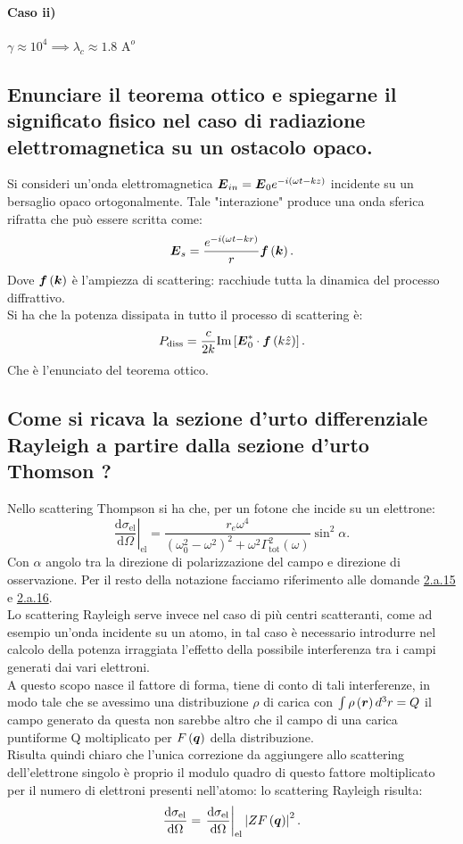 \paragraph{Caso ii)}	$\gamma\approx 10^4 \implies \lambda_{c}\approx 1.8 \text{ A}^o $


\subsection[]{Enunciare il teorema ottico e spiegarne il significato fisico nel caso di radiazione elettromagnetica su un ostacolo opaco.}
\label{sec:3.b.25}
Si consideri un'onda elettromagnetica $\boldsymbol{E}_{in}= \boldsymbol{E}_{0}e^{-i\left( \omega t - kz \right) }$ incidente su un bersaglio opaco ortogonalmente. Tale "interazione" produce una onda sferica rifratta che può essere scritta come:
\[
	\boldsymbol{E}_s= \frac{e^{-i\left( \omega t - kr \right) }}{r}\boldsymbol{f}\left( \boldsymbol{k} \right) 
.\] 
Dove $\boldsymbol{f}\left( \boldsymbol{k} \right) $ è l'ampiezza di scattering: racchiude tutta la dinamica del processo diffrattivo.\\
Si ha che la potenza dissipata in tutto il processo di scattering è:
\[
	P_{\text{diss}}= \frac{c}{2k} \text{Im}\left[ \boldsymbol{E}^*_{0}\cdot \boldsymbol{f}\left( k \hat{z} \right)   \right] 
.\] 
Che è l'enunciato del teorema ottico.

\subsection[]{Come si ricava la sezione d'urto differenziale Rayleigh a partire dalla sezione d'urto Thomson ?}
\label{sec:3.b.26}
Nello scattering Thompson si ha che, per un fotone che incide su un elettrone:
\[
	\left.\frac{\mbox{d} \sigma_{\text{el}}}{\mbox{d} \Omega}\right|_{\text{el}} =  \frac{r_e\omega^4}{\left( \omega^2_0-\omega^2 \right)^2 + \omega^2\Gamma^2_{\text{tot}}\left( \omega \right)} \sin^2\alpha
.\] 
Con $\alpha$ angolo tra la direzione di polarizzazione del campo e direzione di osservazione. Per il resto della notazione facciamo riferimento alle domande \hyperref[subsec: 2.a.15]{2.a.15} e \hyperref[subsec: 2.a.16]{2.a.16}. \\
Lo scattering Rayleigh serve invece nel caso di più centri scatteranti, come ad esempio un'onda incidente su un atomo, in tal caso è necessario introdurre nel calcolo della potenza irraggiata l'effetto della possibile interferenza tra i campi generati dai vari elettroni.\\
A questo scopo nasce il fattore di forma, tiene di conto di tali interferenze, in modo tale che se avessimo una distribuzione $\rho$ di carica con $\int \rho\left( \boldsymbol{r}\right)d^3r=Q$ il campo generato da questa non sarebbe altro che il campo di una carica puntiforme Q moltiplicato per $F\left( \boldsymbol{q} \right) $ della distribuzione.\\
Risulta quindi chiaro che l'unica correzione da aggiungere allo scattering dell'elettrone singolo è proprio il modulo quadro di questo fattore moltiplicato per il numero di elettroni presenti nell'atomo: lo scattering Rayleigh risulta:
\[
	\frac{\mbox{d} \sigma_{\text{el}}}{\mbox{d} \Omega} = \left.\frac{\mbox{d} \sigma_{\text{el}}}{\mbox{d} \Omega}  \right|_{\text{el}}\left| ZF\left( \boldsymbol{q} \right)  \right| ^2
.\] 




